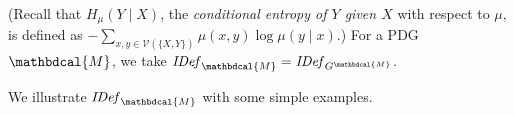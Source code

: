 \documentclass{article}
\theoremstyle{plain}
\theoremstyle{definition}
\theoremstyle{remark}
\newcommand{\commentout}[1]{\ignorespaces}
\newcommand{\V}{\mathcal V}
\newcommand{\dg}[1]{\mathbdcal{#1}}
\newcommand{\IBal}[1]{\mathit{IDef}_{#1}}
\numberwithin{equation}{section}
\begin{document}
\begin{defn}
(Recall that $H_\mu(Y\mid X)$, the
	\emph{conditional entropy of $Y$ given $X$} with respect to $\mu$, is
	defined as 
$- \sum_{x,y \in \V(\{X,Y\})} \mu(x,y) \log \mu(y\mid x)$.)
For a PDG ${\dg M}$, we take $\IBal{\dg M} = \IBal{G^{\dg M}}$.         
\end{defn}

We illustrate $\IBal{\dg M}$ with some simple examples.  
%
\commentout{
	
  This approach combines the benefits of choosing
the maximum-entropy distribution consistent with
constraints \cite{Jaynes57}, while also providing the ability to back off of this (e.g., by providing a universal graph structure), and simultaneously providing a way of articulating qualitative independences.
There is no information required
}
\end{document}
